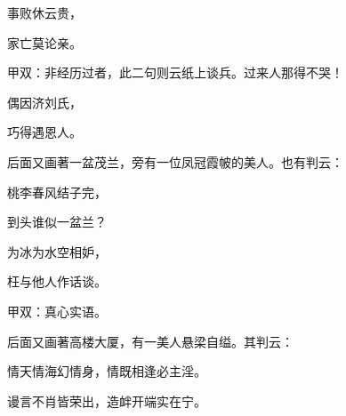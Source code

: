 \begin{poem}
    \begin{pl}事败休云贵，\end{pl}

    \begin{pl}家亡莫论亲。\end{pl}\begin{note}甲双：非经历过者，此二句则云纸上谈兵。过来人那得不哭！\end{note}

    \begin{pl}偶因济刘氏，\end{pl}

    \begin{pl}巧得遇恩人。\end{pl}

\end{poem}

\begin{parag}

    后面又画著一盆茂兰，旁有一位凤冠霞帔的美人。也有判云：
\end{parag}

\begin{poem}
    \begin{pl}桃李春风结子完，\end{pl}

    \begin{pl}到头谁似一盆兰？\end{pl}

    \begin{pl}为冰为水空相妒，\end{pl}

    \begin{pl}枉与他人作话谈。\end{pl}\begin{note}甲双：真心实语。\end{note}

\end{poem}

\begin{parag}
    后面又画著高楼大厦，有一美人悬梁自缢。其判云：
\end{parag}
\begin{poem}
    \begin{pl}情天情海幻情身，情既相逢必主淫。\end{pl}

    \begin{pl}谩言不肖皆荣出，造衅开端实在宁。\end{pl}
\end{poem}

